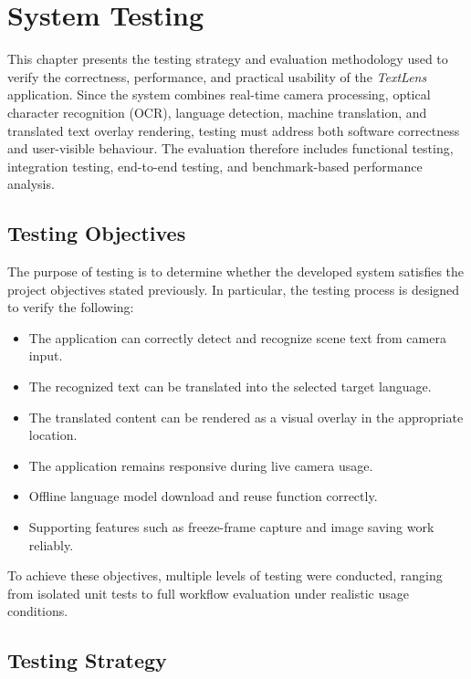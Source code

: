 \chapter{System Testing}
\label{chap:testing-evaluation}

This chapter presents the testing strategy and evaluation methodology used to verify the correctness, performance, and practical usability of the \textit{TextLens} application. Since the system combines real-time camera processing, optical character recognition (OCR), language detection, machine translation, and translated text overlay rendering, testing must address both software correctness and user-visible behaviour. The evaluation therefore includes functional testing, integration testing, end-to-end testing, and benchmark-based performance analysis.

\section{Testing Objectives}

The purpose of testing is to determine whether the developed system satisfies the project objectives stated previously. In particular, the testing process is designed to verify the following:

\begin{itemize}
    \item The application can correctly detect and recognize scene text from camera input.
    \item The recognized text can be translated into the selected target language.
    \item The translated content can be rendered as a visual overlay in the appropriate location.
    \item The application remains responsive during live camera usage.
    \item Offline language model download and reuse function correctly.
    \item Supporting features such as freeze-frame capture and image saving work reliably.
\end{itemize}

To achieve these objectives, multiple levels of testing were conducted, ranging from isolated unit tests to full workflow evaluation under realistic usage conditions.

\section{Testing Strategy}

